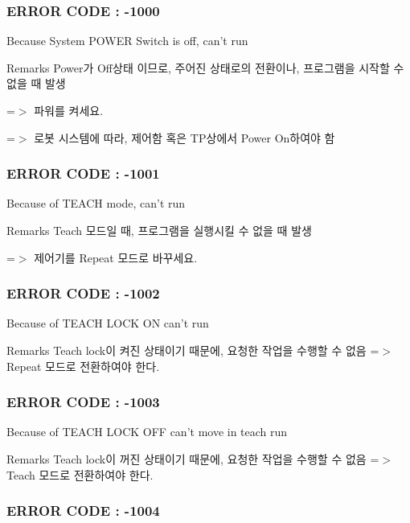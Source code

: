  \subsubsection*{E\-R\-R\-O\-R C\-O\-D\-E \-: -\/1000 }

Because System P\-O\-W\-E\-R Switch is off, can't run \begin{DoxyRemark}{Remarks}
Power가 Off상태 이므로, 주어진 상태로의 전환이나, 프로그램을 시작할 수 없을 때 발생 \par
 =$>$ 파워를 켜세요. \par
 =$>$ 로봇 시스템에 따라, 제어함 혹은 T\-P상에서 Power On하여야 함
\end{DoxyRemark}


 \subsubsection*{E\-R\-R\-O\-R C\-O\-D\-E \-: -\/1001 }

Because of T\-E\-A\-C\-H mode, can't run \begin{DoxyRemark}{Remarks}
Teach 모드일 때, 프로그램을 실행시킬 수 없을 때 발생 \par
 =$>$ 제어기를 Repeat 모드로 바꾸세요.
\end{DoxyRemark}


 \subsubsection*{E\-R\-R\-O\-R C\-O\-D\-E \-: -\/1002 }

Because of T\-E\-A\-C\-H L\-O\-C\-K O\-N can't run \begin{DoxyRemark}{Remarks}
Teach lock이 켜진 상태이기 때문에, 요청한 작업을 수행할 수 없음 =$>$ Repeat 모드로 전환하여야 한다.
\end{DoxyRemark}


 \subsubsection*{E\-R\-R\-O\-R C\-O\-D\-E \-: -\/1003 }

Because of T\-E\-A\-C\-H L\-O\-C\-K O\-F\-F can't move in teach run \begin{DoxyRemark}{Remarks}
Teach lock이 꺼진 상태이기 때문에, 요청한 작업을 수행할 수 없음 =$>$ Teach 모드로 전환하여야 한다.
\end{DoxyRemark}


 \subsubsection*{E\-R\-R\-O\-R C\-O\-D\-E \-: -\/1004 }

